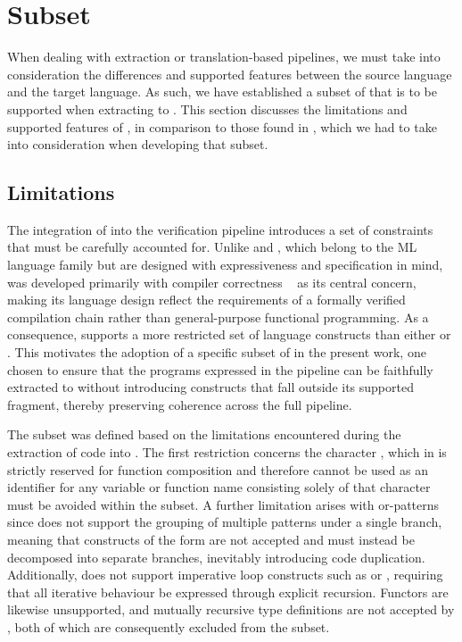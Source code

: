 \section{\whyml Subset}
\label{sec:Whyml_Subset}

When dealing with extraction or translation-based pipelines, we must take into consideration the differences and supported features between the source language and the target language. 
As such, we have established a subset of \whyml that is to be supported when extracting to \cml. This section discusses the limitations and supported features of \cml, in comparison 
to those found in \whyml, which we had to take into consideration when developing that subset.

\subsection{Limitations}

The integration of \cml into the verification pipeline introduces a set of constraints that must be carefully accounted for. Unlike \ocaml and \whyml, 
which belong to the ML language family but are designed with expressiveness and specification in mind, \cml was developed primarily with compiler correctness ~\cite{POPL14,TanMKFON19,SewellMTKMAO23}
as its central concern, making its language design reflect the requirements of a formally verified compilation chain rather than general-purpose functional programming.
As a consequence, \cml supports a more restricted set of language constructs than either \ocaml or \whyml. This motivates the adoption 
of a specific subset of \whyml in the present work, one chosen to ensure that the programs expressed in the pipeline can be faithfully extracted to \cml 
without introducing constructs that fall outside its supported fragment, thereby preserving coherence across the full pipeline.

The subset was defined based on the limitations encountered during the extraction of \whyml code into \cml. The first restriction concerns the character 
, which in \cml is strictly reserved for function composition and therefore cannot be used as an identifier for any variable or function name consisting 
solely of that character must be avoided within the subset. A further limitation arises with or-patterns since \cml does not support the grouping of multiple patterns under a 
single branch, meaning that constructs of the form  are not accepted and must instead be decomposed into separate branches, inevitably 
introducing code duplication. Additionally, \cml does not support imperative loop constructs such as  or , requiring that all iterative 
behaviour be expressed through explicit recursion. Functors are likewise unsupported, and mutually recursive type definitions are not accepted by \cml, both of which are 
consequently excluded from the subset.

